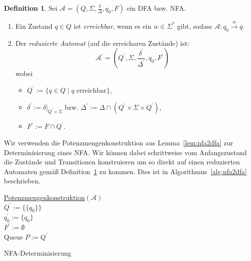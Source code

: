 \documentclass[11pt, a4paper]{article}
\theoremstyle{definition}
\newtheorem{definition}{Definition}[section]
\theoremstyle{plain}
\numberwithin{equation}{section}
\newcommand{\reaches}[1]{\overset{#1}{\rightarrow}}
\begin{document}
\begin{definition}\label{def:reduced_automaton}
	Sei \( \mathcal{A} = (Q, \Sigma, \frac{\delta}{\Delta}, q_0, F) \) ein DFA bzw. NFA.
	\begin{enumerate}
		\item Ein Zustand \( q \in Q \) ist \textit{erreichbar}, wenn es ein \( w \in \Sigma^\ast \) gibt, sodass \( \mathcal{A}: q_0 \reaches{w} q \).
		\item Der \textit{reduzierte Automat} (auf die erreicharen Zustände) ist:
			\[
				\mathcal{A}^\prime = (Q^\prime, \Sigma, \frac{\delta^\prime}{\Delta^\prime}, q_0, F^\prime)
			\]
			wobei
			\begin{itemize}
				\item \( Q^\prime := \{ q \in Q \mid q \text{ erreichbar} \} \),
				\item \( \delta^\prime := \left. \delta \right|_{Q^\prime \times \Sigma} \) bzw. \( \Delta^\prime := \Delta \cap (Q^\prime \times \Sigma \times Q^\prime) \),
				\item \( F^\prime := F \cap Q^\prime\).
			\end{itemize}
	\end{enumerate}
\end{definition}
Wir verwenden die Potenzmengenkonstruktion aus Lemma~\ref{lem:nfa2dfa} zur Determinisierung eines NFA. Wir können dabei schrittweise vom Anfangszustand die Zustände und Transitionen konstruieren um so direkt auf einen reduzierten Automaten gemäß Definition~\ref{def:reduced_automaton} zu kommen. Dies ist in Algorithmus~\ref{alg:nfa2dfa} beschrieben.
\begin{algorithm}
	\underline{Potenzmengenkonstruktion}{$(\mathcal{A})$}\\
	$Q^\prime := \{\{q_0\}\}$\\
	$q_0^\prime := \{q_0\}$\\
	$F^\prime := \emptyset$\\
	Queue $P := Q^\prime$\\
	
	\caption{NFA-Determinisierung}
	\label{alg:nfa2dfa}
\end{algorithm}
\end{document}
